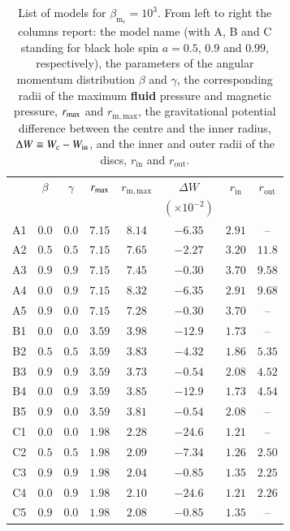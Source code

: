 \documentclass[]{aa}
\begin{document}
\begin{table}
\caption{List of models for $\beta_{\mathrm{m}_{\mathrm{c}}} = 10^{3}$. From left to right the columns report: the model name (with A, B and C standing for black hole spin $a = 0.5$, $0.9$ and $0.99$, respectively), the parameters of the angular momentum distribution $\beta$ and $\gamma$, the corresponding radii of the maximum {\bf fluid} pressure and magnetic pressure, $r_{{\rm{max}}}$ and $r_{{\mathrm{m, max}}}$, the gravitational potential difference between the centre and the inner radius, $\Delta W\equiv W_{\rm c}-W_{\rm in}$, and the inner and outer radii of the discs, $r_{\mathrm{in}}$ and $r_{\mathrm{out}}$.}             
\label{table:1}      
\centering          
\begin{tabular}{c c c c  c c c c}
\hline\hline       
 & $\beta$ & $\gamma$ & $r_{\rm{max}}$ &  $r_{\mathrm{m, max}}$ & $\Delta W$               & $r_{\mathrm{in}}$ & $r_{\mathrm{out}}$ \\ 
 &              &                   &                          &                                        & $(\times 10^{-2})$     &                              &  \\
\hline           
A1 & $0.0$ & $0.0$ & $7.15$ &  $8.14$  & $-6.35$ & $2.91$ & -- \\ 
A2 & $0.5$ & $0.5$ & $7.15$ &  $7.65$  & $-2.27$ & $3.20$ & $11.8$\\ 
A3 & $0.9$ & $0.9$ & $7.15$ &  $7.45$  & $-0.30$ & $3.70$ &  $9.58$\\ 
A4 & $0.0$ & $0.9$ & $7.15$ &  $8.32$  & $-6.35$ & $2.91$ & $9.68$\\ 
A5 & $0.9$ & $0.0$ & $7.15$ &  $7.28$  & $-0.30$ & $3.70$ & --\\ 
 \hline 
B1 & $0.0$ & $0.0$ & $3.59$ &  $3.98$  & $-12.9$ & $1.73$ & -- \\ 
B2 & $0.5$ & $0.5$ & $3.59$ &  $3.83$  & $-4.32$ & $1.86$ & $5.35$\\ 
B3 & $0.9$ & $0.9$ & $3.59$ &  $3.73$  & $-0.54$ & $2.08$ & $4.52$\\ 
B4 & $0.0$ & $0.9$ & $3.59$ &  $3.85$  & $-12.9$ & $1.73$ & $4.54$\\ 
B5 & $0.9$ & $0.0$ & $3.59$ &  $3.81$  & $-0.54$ & $2.08$ & -- \\  
 \hline 
C1 & $0.0$ & $0.0$ & $1.98$ &  $2.28$  & $-24.6$ & $1.21$ & -- \\ 
C2 & $0.5$ & $0.5$ & $1.98$ &  $2.09$  & $-7.34$ & $1.26$ & $2.50$\\ 
C3 & $0.9$ & $0.9$ & $1.98$ &  $2.04$  & $-0.85$ & $1.35$ & $2.25$\\ 
C4 & $0.0$ & $0.9$ & $1.98$ &  $2.10$  & $-24.6$ & $1.21$ & $2.26$\\ 
C5 & $0.9$ & $0.0$ & $1.98$ &  $2.08$  & $-0.85$ & $1.35$ & --\\ 
\hline      
\end{tabular}
\end{table}
\end{document}
